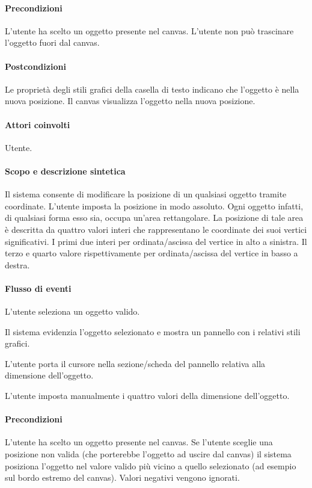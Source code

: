 \paragraph{Precondizioni} L'utente ha scelto un oggetto presente nel canvas. L'utente non pu\` o trascinare l'oggetto fuori dal canvas.
\paragraph{Postcondizioni} Le propriet\` a degli stili grafici della casella di testo indicano che l'oggetto \` e nella nuova posizione. Il canvas visualizza l'oggetto nella nuova posizione.
 

\paragraph{Attori coinvolti} Utente.
\paragraph{Scopo e descrizione sintetica}   Il sistema consente di modificare la posizione di un qualsiasi oggetto tramite coordinate.  L'utente  imposta la posizione in modo assoluto. Ogni oggetto infatti, di qualsiasi forma esso sia, occupa un'area rettangolare. La posizione di tale area \`e descritta da quattro valori interi che rappresentano le coordinate dei suoi vertici significativi. I primi due interi per ordinata/ascissa del vertice in alto a sinistra. Il terzo e quarto valore rispettivamente per ordinata/ascissa del vertice in basso a destra.
\paragraph{Flusso di eventi}
\begin{elenconumerato}[\textbf{}]{\subsubsecindent}
\item  L'utente seleziona un oggetto valido.
\item  Il sistema evidenzia l'oggetto selezionato e mostra un pannello con i relativi stili grafici.
\item  L'utente porta  il cursore nella sezione/scheda del pannello relativa alla dimensione dell'oggetto.
\item  L'utente imposta manualmente i quattro valori della dimensione dell'oggetto.
\end{elenconumerato}
\paragraph{Precondizioni} L'utente ha scelto un oggetto  presente nel canvas. Se l'utente sceglie una posizione non valida (che porterebbe l'oggetto ad uscire dal canvas) il sistema posiziona l'oggetto nel valore valido pi\` u vicino a quello selezionato (ad esempio sul bordo estremo del canvas). Valori negativi vengono ignorati.
